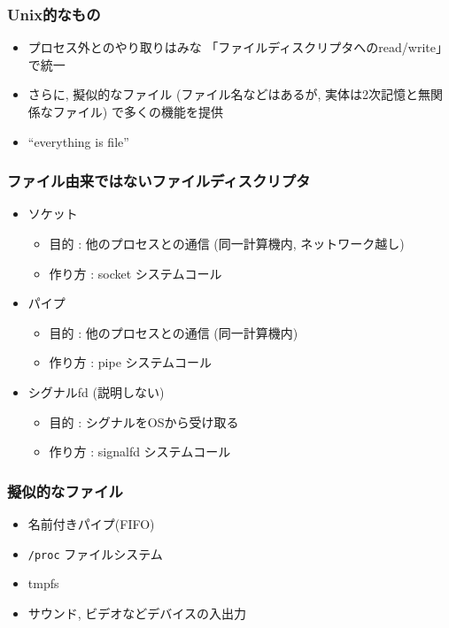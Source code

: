 \documentclass[12pt,dvipdfmx]{beamer}
\begin{document}
\begin{frame}
  \frametitle{Unix的なもの}
  \begin{itemize}
  \item プロセス外とのやり取りはみな
    「ファイルディスクリプタへのread/write」で統一
  \item さらに, 擬似的なファイル
    (ファイル名などはあるが, 実体は2次記憶と無関係なファイル)
    で多くの機能を提供
  \item ``everything is file''
  \end{itemize}
\end{frame}

\begin{frame}
  \frametitle{ファイル由来ではないファイルディスクリプタ}
  \begin{itemize}
  \item ソケット
    \begin{itemize}
    \item 目的 : 他のプロセスとの通信 (同一計算機内, ネットワーク越し)
    \item 作り方 : socket システムコール
    \end{itemize}
  \item パイプ
    \begin{itemize}
    \item 目的 : 他のプロセスとの通信 (同一計算機内)
    \item 作り方 : pipe システムコール
    \end{itemize}
  \item シグナルfd (説明しない)
    \begin{itemize}
    \item 目的 : シグナルをOSから受け取る
    \item 作り方 : signalfd システムコール
    \end{itemize}
  \end{itemize}
\end{frame}

\begin{frame}
  \frametitle{擬似的なファイル}
  \begin{itemize}
  \item 名前付きパイプ(FIFO)
  \item {\tt /proc} ファイルシステム
  \item tmpfs
  \item サウンド, ビデオなどデバイスの入出力
  \end{itemize}
\end{frame}
\end{document}
